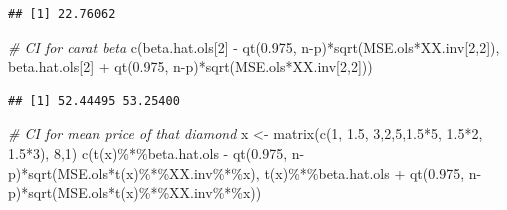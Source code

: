 \documentclass[
]{book}
\newenvironment{Shaded}{\begin{snugshade}}{\end{snugshade}}
\newcommand{\CommentTok}[1]{\textcolor[rgb]{0.56,0.35,0.01}{\textit{#1}}}
\newcommand{\DecValTok}[1]{\textcolor[rgb]{0.00,0.00,0.81}{#1}}
\newcommand{\FloatTok}[1]{\textcolor[rgb]{0.00,0.00,0.81}{#1}}
\newcommand{\FunctionTok}[1]{\textcolor[rgb]{0.00,0.00,0.00}{#1}}
\newcommand{\NormalTok}[1]{#1}
\newcommand{\OtherTok}[1]{\textcolor[rgb]{0.56,0.35,0.01}{#1}}
\newcommand{\SpecialCharTok}[1]{\textcolor[rgb]{0.00,0.00,0.00}{#1}}
\begin{document}
\begin{verbatim}
## [1] 22.76062
\end{verbatim}

\begin{Shaded}
\begin{Highlighting}[]
\CommentTok{\# CI for carat beta}
\FunctionTok{c}\NormalTok{(beta.hat.ols[}\DecValTok{2}\NormalTok{] }\SpecialCharTok{{-}} \FunctionTok{qt}\NormalTok{(}\FloatTok{0.975}\NormalTok{, n}\SpecialCharTok{{-}}\NormalTok{p)}\SpecialCharTok{*}\FunctionTok{sqrt}\NormalTok{(MSE.ols}\SpecialCharTok{*}\NormalTok{XX.inv[}\DecValTok{2}\NormalTok{,}\DecValTok{2}\NormalTok{]), beta.hat.ols[}\DecValTok{2}\NormalTok{] }\SpecialCharTok{+} \FunctionTok{qt}\NormalTok{(}\FloatTok{0.975}\NormalTok{, n}\SpecialCharTok{{-}}\NormalTok{p)}\SpecialCharTok{*}\FunctionTok{sqrt}\NormalTok{(MSE.ols}\SpecialCharTok{*}\NormalTok{XX.inv[}\DecValTok{2}\NormalTok{,}\DecValTok{2}\NormalTok{]))}
\end{Highlighting}
\end{Shaded}

\begin{verbatim}
## [1] 52.44495 53.25400
\end{verbatim}

\begin{Shaded}
\begin{Highlighting}[]
\CommentTok{\# CI for mean price of that diamond}
\NormalTok{x }\OtherTok{\textless{}{-}} \FunctionTok{matrix}\NormalTok{(}\FunctionTok{c}\NormalTok{(}\DecValTok{1}\NormalTok{, }\FloatTok{1.5}\NormalTok{, }\DecValTok{3}\NormalTok{,}\DecValTok{2}\NormalTok{,}\DecValTok{5}\NormalTok{,}\FloatTok{1.5}\SpecialCharTok{*}\DecValTok{5}\NormalTok{, }\FloatTok{1.5}\SpecialCharTok{*}\DecValTok{2}\NormalTok{, }\FloatTok{1.5}\SpecialCharTok{*}\DecValTok{3}\NormalTok{), }\DecValTok{8}\NormalTok{,}\DecValTok{1}\NormalTok{)}
\FunctionTok{c}\NormalTok{(}\FunctionTok{t}\NormalTok{(x)}\SpecialCharTok{\%*\%}\NormalTok{beta.hat.ols }\SpecialCharTok{{-}} \FunctionTok{qt}\NormalTok{(}\FloatTok{0.975}\NormalTok{, n}\SpecialCharTok{{-}}\NormalTok{p)}\SpecialCharTok{*}\FunctionTok{sqrt}\NormalTok{(MSE.ols}\SpecialCharTok{*}\FunctionTok{t}\NormalTok{(x)}\SpecialCharTok{\%*\%}\NormalTok{XX.inv}\SpecialCharTok{\%*\%}\NormalTok{x), }\FunctionTok{t}\NormalTok{(x)}\SpecialCharTok{\%*\%}\NormalTok{beta.hat.ols }\SpecialCharTok{+} \FunctionTok{qt}\NormalTok{(}\FloatTok{0.975}\NormalTok{, n}\SpecialCharTok{{-}}\NormalTok{p)}\SpecialCharTok{*}\FunctionTok{sqrt}\NormalTok{(MSE.ols}\SpecialCharTok{*}\FunctionTok{t}\NormalTok{(x)}\SpecialCharTok{\%*\%}\NormalTok{XX.inv}\SpecialCharTok{\%*\%}\NormalTok{x))}
\end{Highlighting}
\end{Shaded}
\end{document}
